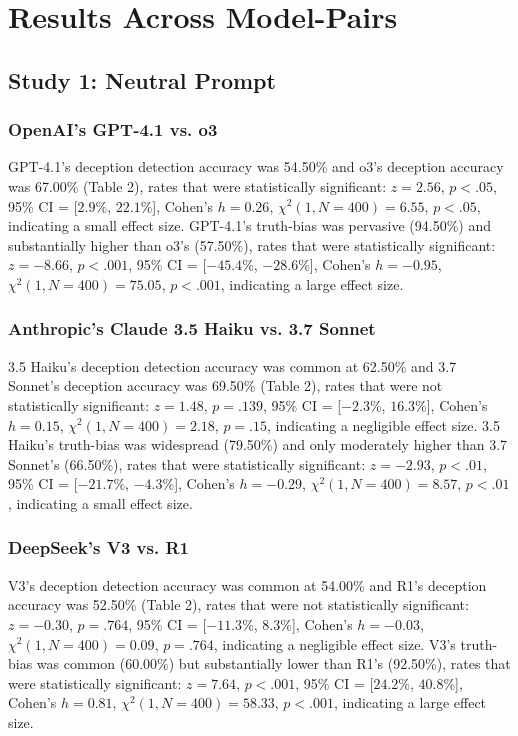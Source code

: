 \documentclass{article}
\begin{document}
\section{Results Across Model-Pairs}
\label{sec:results_across_model_pairs}

\subsection{Study 1: Neutral Prompt}

\subsubsection{OpenAI's GPT-4.1 vs. o3}

GPT-4.1's deception detection accuracy was 54.50\% and o3's deception accuracy was 67.00\% (Table 2), rates that were statistically significant:  $z = 2.56$, $p < .05$, 95\% CI = [$2.9\%$, $22.1\%$], Cohen’s $h =0.26$, $\chi^2(1, N = 400) = 6.55$, $p < .05$, indicating a small effect size. GPT-4.1's truth-bias was pervasive (94.50\%) and substantially higher than o3's (57.50\%), rates that were statistically significant: $z = -8.66$, $p < .001$, 95\% CI = [$-45.4\%$, $-28.6\%$], Cohen’s $h = -0.95$, $\chi^2(1, N = 400) = 75.05$, $p < .001$, indicating a large effect size.

\subsubsection{Anthropic's Claude 3.5 Haiku vs. 3.7 Sonnet}

3.5 Haiku's deception detection accuracy was common at 62.50\% and 3.7 Sonnet's deception accuracy was 69.50\% (Table 2), rates that were not statistically significant:  $z = 1.48$, $p = .139$, 95\% CI = [$-2.3\%$, $16.3\%$], Cohen’s $h =0.15$, $\chi^2(1, N = 400) = 2.18$, $p = .15$, indicating a negligible effect size. 3.5 Haiku's truth-bias was widespread (79.50\%) and only moderately higher than 3.7 Sonnet's (66.50\%), rates that were statistically significant: $z = -2.93$, $p < .01$, 95\% CI = [$-21.7\%$, $-4.3\%$], Cohen’s $h = -0.29$, $\chi^2(1, N = 400) = 8.57$, $p < .01$, indicating a small effect size.

\subsubsection{DeepSeek's V3 vs. R1}

V3's deception detection accuracy was common at 54.00\% and R1's deception accuracy was 52.50\% (Table 2), rates that were not statistically significant:  $z = -0.30$, $p = .764$, 95\% CI = [$-11.3\%$, $8.3\%$], Cohen’s $h =-0.03$, $\chi^2(1, N = 400) = 0.09$, $p = .764$, indicating a negligible effect size. V3's truth-bias was common (60.00\%) but substantially lower than R1's (92.50\%), rates that were statistically significant: $z = 7.64$, $p < .001$, 95\% CI = [$24.2\%$, $40.8\%$], Cohen’s $h = 0.81$, $\chi^2(1, N = 400) = 58.33$, $p < .001$, indicating a large effect size.
\end{document}

